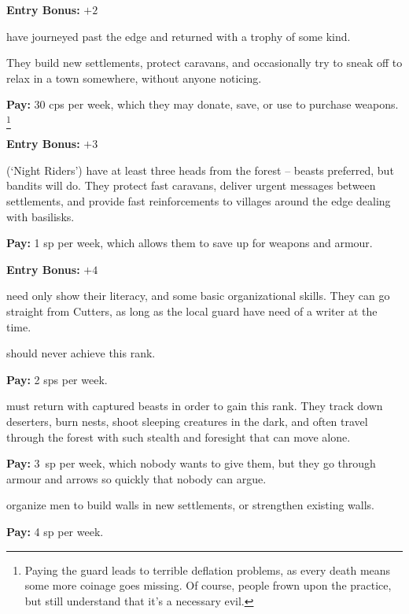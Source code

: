 \begin{multicols}{2}
\begin{description}
  \textbf{Entry Bonus:} $+2$

  have journeyed past the \gls{edge} and returned with a trophy of some kind.

  They build new settlements, protect caravans, and occasionally try to sneak off to relax in a town somewhere, without anyone noticing.

  \textbf{Pay:} 30 \glspl{cp} per week, which they may donate, save, or use to purchase weapons.%
  \footnote{Paying the \gls{guard} leads to terrible deflation problems, as every death means some more coinage goes missing.
  Of course, people frown upon the practice, but still understand that it's a necessary evil.}

  \textbf{Entry Bonus:} $+3$

  (`Night Riders')
  have at least three heads from the forest -- beasts preferred, but bandits will do.
  They protect fast caravans, deliver urgent messages between settlements, and provide fast reinforcements to \glspl{village} around the \gls{edge} dealing with basilisks.

  \textbf{Pay:} 1 \gls{sp} per week, which allows them to save up for weapons and armour.

  \textbf{Entry Bonus:} $+4$

  \item[\Glspl{jotter}]
  \label{jotter}%
  need only show their literacy, and some basic organizational skills.
  They can go straight from Cutters, as long as the local \gls{guard} have need of a writer at the time.

   should never achieve this rank.

  \textbf{Pay:} 2 \glspl{sp} per week.

  \label{ranger}
  must return with captured beasts in order to gain this rank.
  They track down deserters, burn nests, shoot sleeping creatures in the dark, and often travel through the forest with such stealth and foresight that can move alone.
  
  \textbf{Pay:} 3~\gls{sp} per week, which nobody wants to give them, but they go through armour and arrows so quickly that nobody can argue.

  organize men to build walls in new settlements, or strengthen existing walls.

  \textbf{Pay:} 4 \gls{sp} per week.


\end{description}
\end{multicols}
